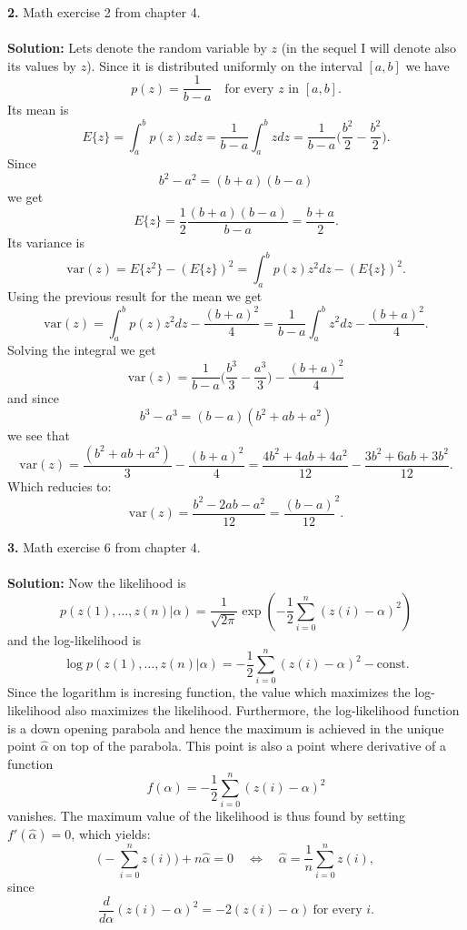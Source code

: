 \documentclass[10pt,a4paper]{amsart}
\newenvironment{tehtratk}%
             {\begin{list}{\arabic{enumi}.}{\usecounter{enumi}%
              \setlength{\labelsep}{0.5em}%
              \settowidth{\labelwidth}{\arabic{enumi}.}%
              \setlength{\leftmargin}{\labelwidth+\labelsep}}}%
             {\end{list}}
\begin{document}
\begin{tehtratk}
\item[\textbf{2.}] Math exercise 2 from chapter 4.\\
\\
\textbf{Solution:} Lets denote the random variable by $z$ (in the sequel I will
denote also its values by $z$). Since it is distributed uniformly on the
interval $[a, b]$ we have
\[
p(z) = \frac{1}{b - a} \quad \text{for every $z$ in $[a, b]$}.
\]
Its mean is
\[
E\{z\} = \int_a^b p(z)zdz = \frac{1}{b - a}\int_a^b zdz =
\frac{1}{b - a}\Big(\frac{b^2}{2} - \frac{b^2}{2}\Big).
\]
Since
\[
b^2 - a^2 = (b + a)(b - a)
\]
we get
\[
E\{z\} =
\frac{1}{2}\frac{(b + a)(b - a)}{b - a} = \frac{b + a}{2}.
\]
Its variance is
\[
\text{var}(z) = E\{z^2\} - (E\{z\})^2 = \int_a^b p(z)z^2dz  - (E\{z\})^2.
\]
Using the previous result for the mean we get
\[
\text{var}(z) = \int_a^b p(z)z^2dz  - \frac{(b + a)^2}{4} =
\frac{1}{b - a}\int_a^b z^2dz - \frac{(b + a)^2}{4}.
\]
Solving the integral we get
\[
\text{var}(z) =
\frac{1}{b - a}\Big(\frac{b^3}{3} - \frac{a^3}{3}\Big)- \frac{(b + a)^2}{4}
\]
and since
\[
b^3 - a^3 = (b -a)(b^2 + ab + a^2)
\]
we see that
\[
\text{var}(z) = \frac{(b^2 + ab + a^2)}{3} - \frac{(b + a)^2}{4}
= \frac{4b^2 + 4ab + 4a^2}{12} -\frac{3b^2 + 6ab + 3b^2}{12}.\]
Which reducies to:
\[
\text{var}(z) = \frac{b^2 - 2ab - a^2}{12} = \frac{(b - a)}{12}^2.
\]
\vspace{0.3cm}
\item[\textbf{3.}] Math exercise 6 from chapter 4.\\
\\
\textbf{Solution:} Now the likelihood is
\[
p(z(1), \ldots , z(n)|\alpha) =
\frac{1}{\sqrt{2 \pi}}\exp(-\frac{1}{2}\sum_{i = 0}^n(z(i) - \alpha)^2)
\]
and the log-likelihood is
\[
\log p(z(1), \ldots , z(n)|\alpha) =
-\frac{1}{2}\sum_{i = 0}^n(z(i) - \alpha)^2 - \text{const.}
\]
Since the logarithm is incresing function, the value which maximizes the
log-likelihood also maximizes the likelihood. Furthermore, the log-likelihood
function is a down opening parabola and hence the maximum is achieved in the
unique point $\hat{\alpha}$ on top of the parabola. This point is also a point
where derivative of a function
\[f(\alpha) = -\frac{1}{2}\sum_{i = 0}^n(z(i) - \alpha)^2\]
vanishes.
The maximum value of the likelihood is thus found by setting
$f'(\hat{\alpha}) = 0$, which yields:
\[
\big(-\sum_{i = 0}^n z(i)\big) + n\hat{\alpha} = 0
\quad \Leftrightarrow \quad \hat{\alpha} = \frac{1}{n}\sum_{i = 0}^n z(i),
\]
since
\[
\frac{d}{d\alpha}(z(i) - \alpha)^2 = -2(z(i) -\alpha) \ \text{for every $i$.}
\]
\end{tehtratk}
\end{document}
